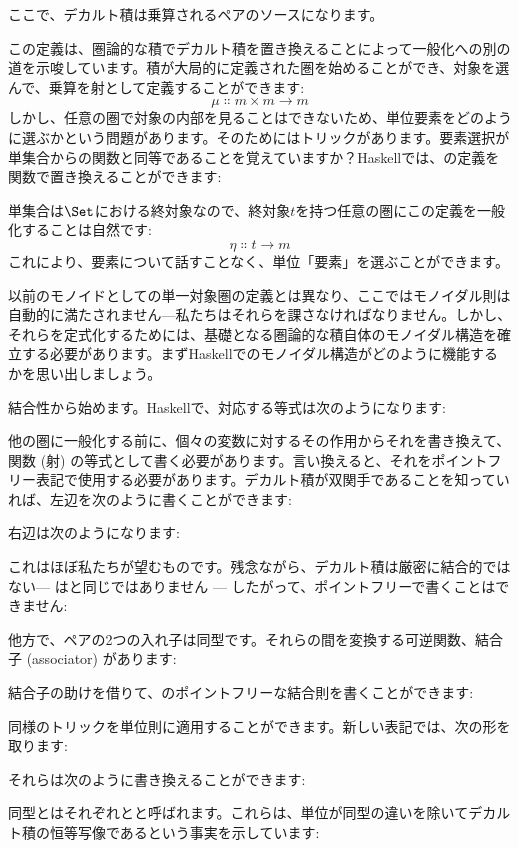 ここで、デカルト積は乗算されるペアのソースになります。

この定義は、圏論的な積でデカルト積を置き換えることによって一般化への別の道を示唆しています。積が大局的に定義された圏を始めることができ、対象を選んで、乗算を射として定義することができます: 
\[\mu \Colon m\times{}m \to m\]
しかし、任意の圏で対象の内部を見ることはできないため、単位要素をどのように選ぶかという問題があります。そのためにはトリックがあります。要素選択が単集合からの関数と同等であることを覚えていますか？Haskellでは、の定義を関数で置き換えることができます: 

単集合は$\Set$における終対象なので、終対象$t$を持つ任意の圏にこの定義を一般化することは自然です: 
\[\eta \Colon t \to m\]
これにより、要素について話すことなく、単位「要素」を選ぶことができます。

以前のモノイドとしての単一対象圏の定義とは異なり、ここではモノイダル則は自動的に満たされません---私たちはそれらを課さなければなりません。しかし、それらを定式化するためには、基礎となる圏論的な積自体のモノイダル構造を確立する必要があります。まずHaskellでのモノイダル構造がどのように機能するかを思い出しましょう。

結合性から始めます。Haskellで、対応する等式は次のようになります: 

他の圏に一般化する前に、個々の変数に対するその作用からそれを書き換えて、関数 (射) の等式として書く必要があります。言い換えると、それをポイントフリー表記で使用する必要があります。デカルト積が双関手であることを知っていれば、左辺を次のように書くことができます: 

右辺は次のようになります: 

これはほぼ私たちが望むものです。残念ながら、デカルト積は厳密に結合的ではない--- はと同じではありません --- したがって、ポイントフリーで書くことはできません: 

他方で、ペアの2つの入れ子は同型です。それらの間を変換する可逆関数、結合子 (associator) があります: 

結合子の助けを借りて、のポイントフリーな結合則を書くことができます: 

同様のトリックを単位則に適用することができます。新しい表記では、次の形を取ります: 

それらは次のように書き換えることができます: 

同型とはそれぞれとと呼ばれます。これらは、単位\code{()}が同型の違いを除いてデカルト積の恒等写像であるという事実を示しています: 

